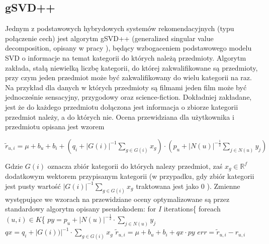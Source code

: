\documentclass{pracamgr}
\begin{document}
   \subsection{gSVD++}
    Jednym z podstawowych hybrydowych systemów rekomendacyjnych (typu połączenie cech) jest algorytm gSVD++
    (generalized singular value decomposition, opisany w pracy \cite{gSVD++}),
    będący wzbogaceniem podstawowego modelu SVD o informacje na temat kategorii do których należą przedmioty.
    Algorytm zakłada, stałą niewielką liczbę kategorii, do której zakwalifikowane są przedmioty, przy czym jeden przedmiot może być zakwalifikowany do wielu
    kategorii na raz.
    Na przykład dla danych w których przedmioty są filmami jeden film może być jednocześnie sensacyjny, przygodowy oraz science-fiction.
    Dokładniej zakładane, jest że do każdego przedmiotu dołączona jest informacja o zbiorze kategorii przedmiot należy, a do których nie.\newline
    Ocena przewidziana dla użytkownika i przedmiotu opisana jest wzorem
    \begin{center}
     $\tilde{r}_{u,i}=\mu+b_u+b_i+\left(q_i+|G(i)|^{-1}\sum\limits_{g\in G(i)}x_{g}\right)\cdot\left(p_u +|N(u)|^{-\frac{1}{2}}\sum\limits_{j\in N(u)}y_j\right)$
    \end{center}
    Gdzie $G(i)$ oznacza zbiór kategorii do których nalezy przedmiot, zaś $x_{g}\in\mathbb{R}^f$ dodatkowym wektorem przypisanym kategorii
    (w przypadku, gdy zbiór kategorii jest pusty wartość $|G(i)|^{-1}\sum\limits_{g\in G(i)}x_{g}$ traktowana jest jako $0$ ).
    Zmienne występujące we wzorach na przewidziane oceny optymalizowane są przez standardowy algorytm opisany pseudokodem:\newline
    \hspace*{16pt}	for $I$ iterations\{\newline
    \hspace*{32pt}		foreach $(u,i)\in K$\{\newline
    \hspace*{48pt}			$py=p_u +|N(u)|^{-\frac{1}{2}}\cdot\sum\limits_{j\in N(u)}y_j$\newline
    \hspace*{48pt}			$qx=q_i +|G(i))|^{-1}\cdot\sum\limits_{g\in G(i)}x_g$\newline
    \hspace*{48pt}			$\tilde{r}_{u,i}=\mu+b_u+b_i+qx\cdot py$\newline
    \hspace*{48pt}			$err=\tilde{r}_{u,i}-r_{u,i}$\newline
\end{document}
